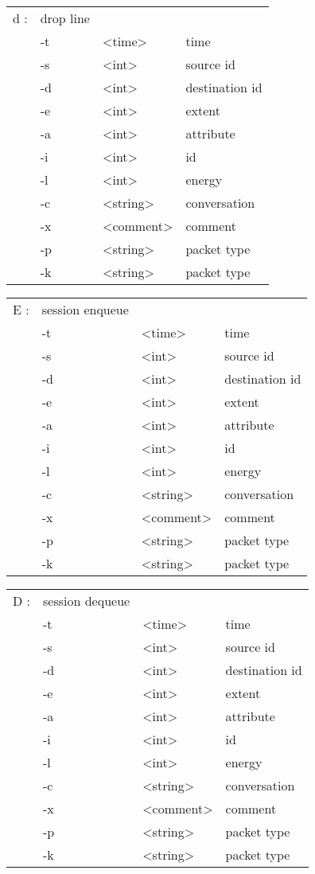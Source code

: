   \begin{tabular}{llll}
  d : & drop line & & \\
    &  -t & <time> & time \\
    &  -s & <int> & source id \\
    &  -d & <int> & destination id \\
    &  -e & <int> & extent \\
    &  -a & <int> & attribute \\
    &  -i & <int> & id \\
    &  -l & <int> & energy \\
    &  -c & <string> & conversation \\
    &  -x & <comment> & comment \\
    &  -p & <string> & packet type \\
    &  -k & <string> & packet type \\
  \end{tabular}

  \begin{tabular}{llll}
  E : & session enqueue & & \\
    &  -t & <time> & time \\
    &  -s & <int> & source id \\
    &  -d & <int> & destination id \\
    &  -e & <int> & extent \\
    &  -a & <int> & attribute \\
    &  -i & <int> & id \\
    &  -l & <int> & energy \\
    &  -c & <string> & conversation \\
    &  -x & <comment> & comment \\
    &  -p & <string> & packet type \\
    &  -k & <string> & packet type \\
  \end{tabular}

  \begin{tabular}{llll}
  D : & session dequeue & & \\
    &  -t & <time> & time \\
    &  -s & <int> & source id \\
    &  -d & <int> & destination id \\
    &  -e & <int> & extent \\
    &  -a & <int> & attribute \\
    &  -i & <int> & id \\
    &  -l & <int> & energy \\
    &  -c & <string> & conversation \\
    &  -x & <comment> & comment \\
    &  -p & <string> & packet type \\
    &  -k & <string> & packet type \\
  \end{tabular}

